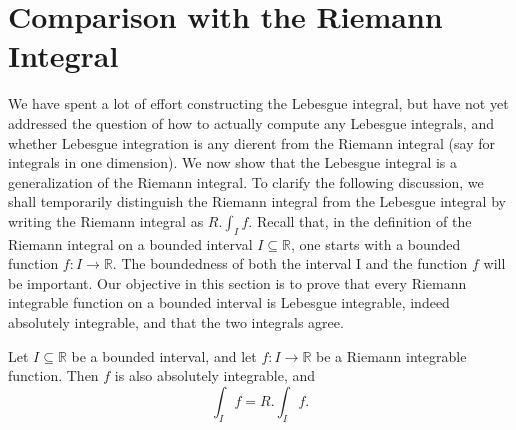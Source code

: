 \section{Comparison with the Riemann Integral}
We have spent a lot of effort constructing the Lebesgue integral, but have not yet addressed the question of how to actually compute any Lebesgue integrals, and whether Lebesgue integration is any dierent from the Riemann integral (say for integrals in one dimension). We now show that the Lebesgue integral is a generalization of the Riemann integral. To clarify the following discussion, we shall temporarily distinguish the Riemann integral from the Lebesgue integral by writing the Riemann integral as \(R. \int _I f\). Recall that, in the definition of the Riemann integral on a bounded interval \(I \subseteq \mathbb{R}\), one starts with a bounded function \(f: I \to \mathbb{R}\). The boundedness of both the interval I and the function \(f\) will be important. Our objective
in this section is to prove that every Riemann integrable function on a bounded interval is Lebesgue integrable, indeed absolutely integrable, and that the two integrals agree.

\begin{proposition}
    Let \(I \subseteq \mathbb{R}\) be a bounded interval, and let \(f: I \to \mathbb{R}\) be a Riemann integrable function. Then \(f\) is also absolutely integrable, and 
    \[
        \int _I f = R. \int _I f.
    \]  
\end{proposition}

